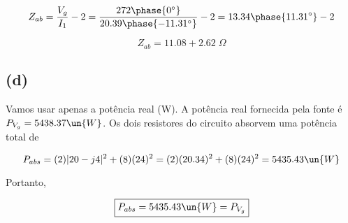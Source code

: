 \[ Z_{ab} = \frac{V_g}{I_1} - 2 = \frac{272\phase{0^{\circ}}}{20.39\phase{-11.31^{\circ}}} - 2 = 13.34\phase{11.31^{\circ}} - 2 \]

\[ \boxed{Z_{ab} = 11.08 + 2.62 \;\Omega} \]

\subsection*{(d)}

Vamos usar apenas a potência real (W). A potência real fornecida pela fonte é $P_{V_g} = 5438.37 \un{W}$. Os dois resistores
do circuito absorvem uma potência total de 

\[ P_{abs} = (2)|20 - j4|^2 + (8)(24)^2 = (2)(20.34)^2 + (8)(24)^2 = 5435.43 \un{W}  \]

Portanto, 

\[ \boxed{P_{abs} = 5435.43 \un{W} = P_{V_g}} \]









